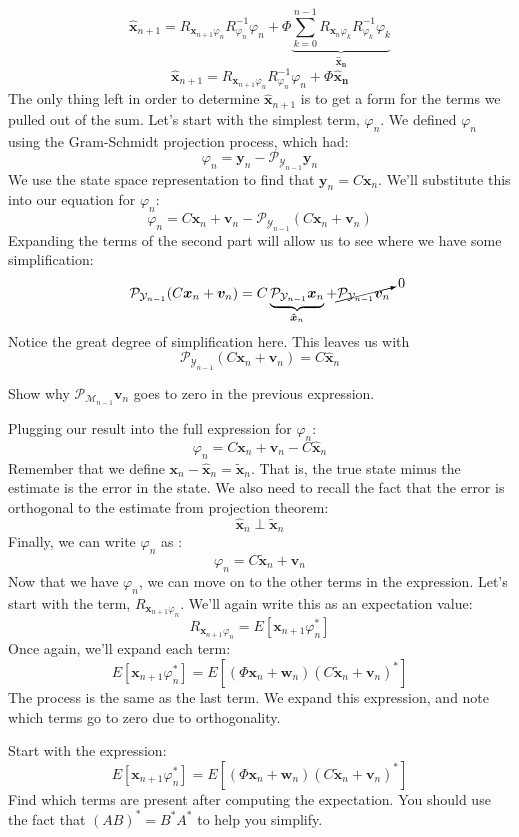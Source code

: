$$\bm{\hat{x}}_{n+1}=R_{\bm{x}_{n+1} \varphi_n} R_{\varphi_{n}}^{-1}\varphi_n+\Phi\underbrace{\sum_{k=0}^{n-1}R_{\bm{x}_{n} \varphi_k} R_{\varphi_{k}}^{-1}\varphi_k}_{\bm{\hat{x}_n}}$$
$$\bm{\hat{x}}_{n+1}=R_{\bm{x}_{n+1} \varphi_n} R_{\varphi_{n}}^{-1}\varphi_n+\Phi\bm{\hat{x}_n}$$
The only thing left in order to determine $\bm{\hat{x}}_{n+1}$ is to get a form for the terms we pulled out of the sum. Let's start with the simplest term, $\varphi_n$. We defined $\varphi_n$ using the Gram-Schmidt projection process, which had:
$$\varphi_n=\bm{y}_n-\mathcal{P}_{\mathcal{Y}_{n-1}}\bm{y}_n$$
We use the state space representation to find that $\bm{y}_n=C\bm{x}_n$. We'll substitute this into our equation for $\varphi_n$:
$$\varphi_n=C\bm{x}_n+\bm{v}_n-\mathcal{P}_{\mathcal{Y}_{n-1}}(C\bm{x}_n+\bm{v}_n)$$
Expanding the terms of the second part will allow us to see where we have some simplification:
$$\mathcal{P}_{\mathcal{Y}_{n-1}}(C\bm{x}_n+\bm{v}_n)=C\underbrace{\mathcal{P}_{\mathcal{Y}_{n-1}}\bm{x}_n}_{\bm{\hat{x}}_n}+\cancelto{0}{\mathcal{P}_{\mathcal{Y}_{n-1}}\bm{v}_n}$$
Notice the great degree of simplification here. This leaves us with
$$\mathcal{P}_{\mathcal{Y}_{n-1}}(C\bm{x}_n+\bm{v}_n)=C\bm{\hat{x}}_n$$
\begin{exercise}
Show why $\mathcal{P}_{\mathcal{M}_{n-1}}\bm{v}_n$ goes to zero in the previous expression.
\end{exercise}
Plugging our result into the full expression for $\varphi_n$:
$$\varphi_n=C\bm{x}_n+\bm{v}_n-C\bm{\hat{x}}_n$$
Remember that we define $\bm{x}_n-\bm{\hat{x}}_n=\bm{\tilde{x}}_n$. That is, the true state minus the estimate is the error in the state. We also need to recall the fact that the error is orthogonal to the estimate from projection theorem:
$$\bm{\hat{x}}_n \perp \bm{\tilde{x}}_n$$
Finally, we can write $\varphi_n$ as :
$$\varphi_n=C\bm{\tilde{x}}_n+\bm{v}_n$$
Now that we have $\varphi_n$, we can move on to the other terms in the expression. Let's start with the term, $R_{\bm{x}_{n+1} \varphi_n}$. We'll again write this as an expectation value:
$$R_{\bm{x}_{n+1} \varphi_n}=E[\bm{x}_{n+1} \varphi_n^*]$$
Once again, we'll expand each term:
$$E[\bm{x}_{n+1} \varphi_n^*]=E[(\Phi\bm{x}_n+\bm{w}_n)(C\bm{\tilde{x}}_n+\bm{v}_n)^*]$$
The process is the same as the last term. We expand this expression, and note which terms go to zero due to orthogonality. 
\begin{exercise}
Start with the expression:
$$E[\bm{x}_{n+1} \varphi_n^*]=E[(\Phi\bm{x}_n+\bm{w}_n)(C\bm{\tilde{x}}_n+\bm{v}_n)^*]$$
Find which terms are present after computing the expectation. You should use the fact that $(AB)^*=B^*A^*$ to help you simplify.
\end{exercise}


